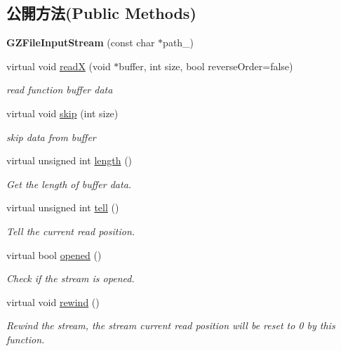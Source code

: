 \subsection*{公開方法(Public Methods)}
\begin{DoxyCompactItemize}
\item 
{\bfseries G\+Z\+File\+Input\+Stream} (const char $\ast$path\+\_\+)\hypertarget{class_magnum_1_1_g_z_file_input_stream_a374d9e50ff8e98020268596e7cbcdc60}{}\label{class_magnum_1_1_g_z_file_input_stream_a374d9e50ff8e98020268596e7cbcdc60}

\item 
virtual void \hyperlink{class_magnum_1_1_g_z_file_input_stream_adea59aaa77824df9f856e3b11d433712}{readX} (void $\ast$buffer, int size, bool reverse\+Order=false)
\begin{DoxyCompactList}\small\item\em read function buffer data \end{DoxyCompactList}\item 
virtual void \hyperlink{class_magnum_1_1_g_z_file_input_stream_a16b132b278dd49f6129f9b6ec15ec970}{skip} (int size)
\begin{DoxyCompactList}\small\item\em skip data from buffer \end{DoxyCompactList}\item 
virtual unsigned int \hyperlink{class_magnum_1_1_g_z_file_input_stream_aa9356a2f9c59c857353f7b3857c05db6}{length} ()
\begin{DoxyCompactList}\small\item\em Get the length of buffer data. \end{DoxyCompactList}\item 
virtual unsigned int \hyperlink{class_magnum_1_1_g_z_file_input_stream_af46fb848ff587063203fb4f7fc860cc7}{tell} ()
\begin{DoxyCompactList}\small\item\em Tell the current read position. \end{DoxyCompactList}\item 
virtual bool \hyperlink{class_magnum_1_1_g_z_file_input_stream_aeb850cf00e3285655588249c72cb297c}{opened} ()
\begin{DoxyCompactList}\small\item\em Check if the stream is opened. \end{DoxyCompactList}\item 
virtual void \hyperlink{class_magnum_1_1_g_z_file_input_stream_abc1433e7f7cfcdf529785053a4841168}{rewind} ()
\begin{DoxyCompactList}\small\item\em Rewind the stream, the stream current read position will be reset to 0 by this function. \end{DoxyCompactList}\end{DoxyCompactItemize}
